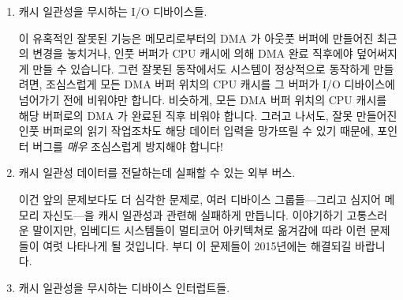 \begin{enumerate}
\item	캐시 일관성을 무시하는 I/O 디바이스들.

	이 유혹적인 잘못된 기능은 메모리로부터의 DMA 가 아웃풋 버퍼에 만들어진
	최근의 변경을 놓치거나, 인풋 버퍼가 CPU 캐시에 의해 DMA 완료 직후에야
	덮어써지게 만들 수 있습니다.
	그런 잘못된 동작에서도 시스템이 정상적으로 동작하게 만들려면,
	조심스럽게 모든 DMA 버퍼 위치의 CPU 캐시를 그 버퍼가 I/O 디바이스에
	넘어가기 전에 비워야만 합니다.
	비슷하게, 모든 DMA 버퍼 위치의 CPU 캐시를 해당 버퍼로의 DMA 가 완료된
	직후 비워야 합니다.
	그러고 나서도, 잘못 만들어진 인풋 버퍼로의 읽기 작업조차도 해당 데이터
	입력을 망가뜨릴 수 있기 때문에, 포인터 버그를 \emph{매우} 조심스럽게
	방지해야 합니다!
\iffalse
\item	I/O devices that ignore cache coherence.

	This charming misfeature can result in DMAs from memory
	missing recent changes to the output buffer, or, just as
	bad, cause input buffers to be overwritten by the contents
	of CPU caches just after the DMA completes.
	To make your system work in face of such misbehavior,
	you must carefully flush the CPU caches of any location
	in any DMA buffer before presenting that buffer to the
	I/O device.
	Similarly, you need to flush the CPU caches of any location
	in any DMA buffer after DMA to that buffer completes.
	And even then, you need to be \emph{very} careful to avoid
	pointer bugs, as even a misplaced read to an input buffer
	can result in corrupting the data input!
\fi

\item	캐시 일관성 데이터를 전달하는데 실패할 수 있는 외부 버스.

	이건 앞의 문제보다도 더 심각한 문제로, 여러 디바이스 그룹들---그리고
	심지어 메모리 자신도---을 캐시 일관성과 관련해 실패하게 만듭니다.
	이야기하기 고통스러운 말이지만, 임베디드 시스템들이 멀티코어 아키텍쳐로
	옮겨감에 따라 이런 문제들이 여럿 나타나게 될 것입니다.
	부디 이 문제들이 2015년에는 해결되길 바랍니다.
\iffalse

\item	External busses that fail to transmit cache-coherence data.

	This is an even more painful variant of the above problem,
	but causes groups of devices---and even memory itself---to
	fail to respect cache coherence.
	It is my painful duty to inform you that as embedded systems
	move to multicore architectures, we will no doubt see a fair
	number of such problems arise.
	Hopefully these problems will clear up by the year 2015.
\fi
\item	캐시 일관성을 무시하는 디바이스 인터럽트들.


\end{enumerate}
